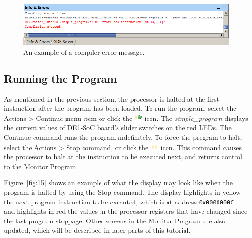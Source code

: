 \documentclass[11pt, twoside, pdftex]{article}
\begin{document}
\begin{figure}[H]
   \begin{center}
      \includegraphics[scale=1]{screenshots/figure14.png}
   \end{center}
   \caption{An example of a compiler error message.} 
	 \label{fig:14}
\end{figure}

\subsection{Running the Program}
\label{sec:3.3}

As mentioned in the previous section, the processor is halted at
the first instruction after the program has been loaded. 
To run the program, select the \textsf{Actions > Continue} menu
item or click the \includegraphics{toolbar/continue.png} icon.  The {\it simple\_program} displays the current values of
DE1-SoC board's slider switches on the red LEDs.
The \textsf{Continue} command runs the program indefinitely.
To force the program to halt,
select the \textsf{Actions > Stop} command, or click the
\includegraphics{toolbar/stop.png} icon. This command causes the
processor to halt at the instruction to be executed next, and
returns control to the Monitor Program. 

Figure~\ref{fig:15} shows an example of what the display may look like when
the program is halted by using the {\sf Stop} command. 
The display highlights in yellow the next program instruction to
be executed, which is at address \texttt {0x0000000C},
and highlights in red the values in the processor
registers that have changed since the last program stoppage.
Other screens in the Monitor Program are also updated, which will
be described in later parts of this tutorial.
\end{document}
